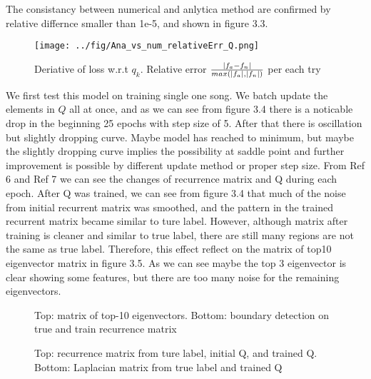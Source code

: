 \documentclass[final]{siamltexmm}
\begin{document}
The consistancy between numerical and anlytica method are confirmed by relative differnce smaller than 1e-5, and shown in figure 3.3.
\begin{figure}[H]
  \centering
    \texttt{[image: ../fig/Ana\_vs\_num\_relativeErr\_Q.png]}
  \caption{Deriative of loss w.r.t $q_k$. Relative error $|f_a - f_n| \over max(|f_a|, |f_n|)$ per each try}
\end{figure}
We first test this model on training single one song. We batch update the elements in $Q$ all at once, and as we can see from figure 3.4 there is a noticable drop in the beginning 25 epochs with step size of 5. After that there is oscillation but slightly dropping curve. Maybe model has reached to minimum, but maybe the slightly dropping curve implies the possibility at saddle point and further improvement is possible by different update method or proper step size. From Ref 6 and Ref 7 we can see the changes of recurrence matrix and Q during each epoch. After Q was trained, we can see from figure 3.4 that much of the noise from initial recurrent matrix was smoothed, and the pattern in the trained recurrent matrix became similar to ture label. However, although matrix after training is cleaner and similar to true label, there are still many regions are not the same as true label. Therefore, this effect reflect on the matrix of top10 eigenvector matrix in figure 3.5. As we can see maybe the top 3 eigenvector is clear showing some features, but there are too many noise for the remaining eigenvectors.
\begin{figure}[H]
\centering
\begin{subfigure}
   \texttt{[image: ../fig/OnlyOne\_Alpha5\_0\_epch394\_err.png]}
\end{subfigure}

\begin{subfigure}
   \texttt{[image: ../fig/gm\_Q.png]}
\end{subfigure}
\caption{Top: matrix of top-10 eigenvectors. Bottom: boundary detection on true and train recurrence matrix}
\end{figure}

\begin{figure}[H]
\centering
   \begin{subfigure}
   \texttt{[image: ../fig/L\_Q.png]}
\end{subfigure}

\begin{subfigure}
   \texttt{[image: ../fig/L\_Boundary.png]}
\end{subfigure}
\caption{Top: recurrence matrix from ture label, initial Q, and trained Q. Bottom: Laplacian matrix from true label and trained Q}
\end{figure}
\end{document}
